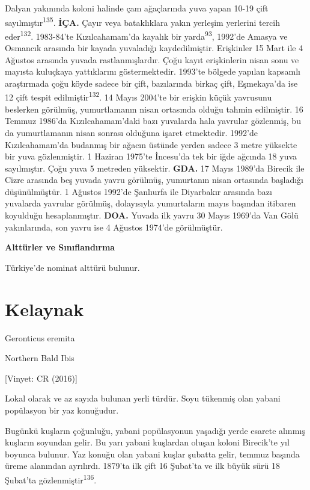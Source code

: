\documentclass[
  letterpaper,
  DIV=11,
  numbers=noendperiod]{scrreprt}
\begin{document}
Dalyan yakınında koloni halinde çam ağaçlarında yuva yapan 10-19 çift
sayılmıştır\textsuperscript{135}. \textbf{İÇA.} Çayır veya bataklıklara
yakın yerleşim yerlerini tercih eder\textsuperscript{132}. 1983-84'te
Kızılcahamam'da kayalık bir yarda\textsuperscript{93}, 1992'de Amasya ve
Osmancık arasında bir kayada yuvaladığı kaydedilmiştir. Erişkinler 15
Mart ile 4 Ağustos arasında yuvada rastlanmışlardır. Çoğu kayıt
erişkinlerin nisan sonu ve mayısta kuluçkaya yattıklarını
göstermektedir. 1993'te bölgede yapılan kapsamlı araştırmada çoğu köyde
sadece bir çift, bazılarında birkaç çift, Eşmekaya'da ise 12 çift tespit
edilmiştir\textsuperscript{132}. 14 Mayıs 2004'te bir erişkin küçük
yavrusunu beslerken görülmüş, yumurtlamanın nisan ortasında olduğu
tahmin edilmiştir. 16 Temmuz 1986'da Kızılcahamam'daki bazı yuvalarda
hala yavrular gözlenmiş, bu da yumurtlamanın nisan sonrası olduğuna
işaret etmektedir. 1992'de Kızılcahamam'da budanmış bir ağacın üstünde
yerden sadece 3 metre yüksekte bir yuva gözlenmiştir. 1 Haziran 1975'te
İncesu'da tek bir iğde ağcında 18 yuva sayılmıştır. Çoğu yuva 5 metreden
yüksektir. \textbf{GDA.} 17 Mayıs 1989'da Birecik ile Cizre arasında beş
yuvada yavru görülmüş, yumurtanın nisan ortasında başladığı
düşünülmüştür. 1 Ağustos 1992'de Şanlıurfa ile Diyarbakır arasında bazı
yuvalarda yavrular görülmüş, dolayısıyla yumurtaların mayıs başından
itibaren koyulduğu hesaplanmıştır. \textbf{DOA.} Yuvada ilk yavru 30
Mayıs 1969'da Van Gölü yakınlarında, son yavru ise 4 Ağustos 1974'de
görülmüştür.

\textbf{Alttürler ve Sınıflandırma}

Türkiye'de nominat alttürü bulunur.

\section{Kelaynak}\label{kelaynak}

Geronticus eremita

Northern Bald Ibis

{[}Vinyet: CR (2016){]}

Lokal olarak ve az sayıda bulunan yerli türdür. Soyu tükenmiş olan
yabani popülasyon bir yaz konuğudur.

Bugünkü kuşların çoğunluğu, yabani popülasyonun yaşadığı yerde esarete
alınmış kuşların soyundan gelir. Bu yarı yabani kuşlardan oluşan koloni
Birecik'te yıl boyunca bulunur. Yaz konuğu olan yabani kuşlar şubatta
gelir, temmuz başında üreme alanından ayrılırdı. 1879'ta ilk çift 16
Şubat'ta ve ilk büyük sürü 18 Şubat'ta
gözlenmiştir\textsuperscript{136}.
\end{document}
